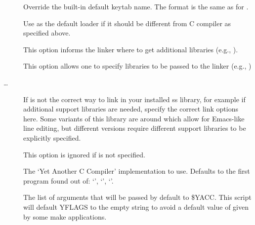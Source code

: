\documentclass[letterpaper,10pt,english]{sphinxmanual}
\begin{document}
\begin{description}
\item[{}] \leavevmode
Override the built-in default keytab name.
The format is the same as for .

\item[{}] \leavevmode
Use  as the default loader if it should be different from
C compiler as specified above.

\item[{}] \leavevmode
This option informs the linker where to get additional libraries
(e.g., ).

\item[{}] \leavevmode
This option allows one to specify libraries to be passed to the
linker (e.g., )

\item[{…}] \leavevmode
If  is not the correct way to link in your installed ss
library, for example if additional support libraries are needed,
specify the correct link options here.  Some variants of this
library are around which allow for Emacs-like line editing, but
different versions require different support libraries to be
explicitly specified.

This option is ignored if \sphinxstylestrong{-} is not specified.

\item[{}] \leavevmode
The ‘Yet Another C Compiler’ implementation to use. Defaults to
the first program found out of: ‘’, ‘’,
‘’.

\item[{}] \leavevmode
The list of arguments that will be passed by default to \$YACC.
This script will default YFLAGS to the empty string to avoid a
default value of  given by some make applications.

\end{description}
\end{document}
